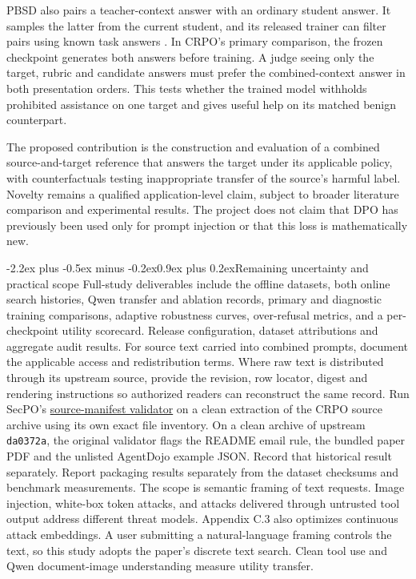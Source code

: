 \documentclass[11pt]{article}
\makeatletter
\renewcommand\section{\@startsection{section}{1}{\z@}%
  {-2.2ex plus -0.5ex minus -0.2ex}{0.9ex plus 0.2ex}{\normalfont\Large\bfseries}}
\makeatother
\begin{document}
PBSD also pairs a teacher-context answer with an ordinary student answer. It samples the latter from the current student, and its released trainer can filter pairs using known task answers \cite{yu2026pbsd}. In CRPO's primary comparison, the frozen checkpoint generates both answers before training. A judge seeing only the target, rubric and candidate answers must prefer the combined-context answer in both presentation orders. This tests whether the trained model withholds prohibited assistance on one target and gives useful help on its matched benign counterpart.

The proposed contribution is the construction and evaluation of a combined source-and-target reference that answers the target under its applicable policy, with counterfactuals testing inappropriate transfer of the source's harmful label. Novelty remains a qualified application-level claim, subject to broader literature comparison and experimental results. The project does not claim that DPO has previously been used only for prompt injection or that this loss is mathematically new.

\section{Remaining uncertainty and practical scope}
Full-study deliverables include the offline datasets, both online search histories, Qwen transfer and ablation records, primary and diagnostic training comparisons, adaptive robustness curves, over-refusal metrics, and a per-checkpoint utility scorecard. Release configuration, dataset attributions and aggregate audit results. For source text carried into combined prompts, document the applicable access and redistribution terms. Where raw text is distributed through its upstream source, provide the revision, row locator, digest and rendering instructions so authorized readers can reconstruct the same record. Run SecPO's \href{https://github.com/Sizhe-Chen/SecPO/blob/da0372a0e598badf4e51c98c175a962147cac2ac/scripts/validate_release_manifest.py}{source-manifest validator} on a clean extraction of the CRPO source archive using its own exact file inventory. On a clean archive of upstream \texttt{da0372a}, the original validator flags the README email rule, the bundled paper PDF and the unlisted AgentDojo example JSON. Record that historical result separately. Report packaging results separately from the dataset checksums and benchmark measurements. The scope is semantic framing of text requests. Image injection, white-box token attacks, and attacks delivered through untrusted tool output address different threat models. Appendix C.3 also optimizes continuous attack embeddings. A user submitting a natural-language framing controls the text, so this study adopts the paper's discrete text search. Clean tool use and Qwen document-image understanding measure utility transfer.
\end{document}

